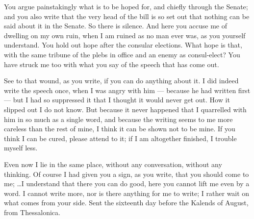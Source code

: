 

 You argue painstakingly what is to be hoped for, and chiefly through the Senate; and you also write that the very head of the bill is so set out that nothing can be said about it in the Senate. So there is silence. And here you accuse me of dwelling on my own ruin, when I am ruined as no man ever was, as you yourself understand. You hold out hope after the consular elections. What hope is that, with the same tribune of the plebs in office and an enemy as consul-elect? You have struck me too with what you say of the speech that has come out.

 See to that wound, as you write, if you can do anything about it. I did indeed write the speech once, when I was angry with him --- because he had written first --- but I had so suppressed it that I thought it would never get out. How it slipped out I do not know. But because it never happened that I quarrelled with him in so much as a single word, and because the writing seems to me more careless than the rest of mine, I think it can be shown not to be mine. If you think I can be cured, please attend to it; if I am altogether finished, I trouble myself less.

 Even now I lie in the same place, without any conversation, without any thinking. Of course I had given you a sign, as you write, that you should come to me; \textdagger\ldots\textdagger I understand that there you can do good, here you cannot lift me even by a word. I cannot write more, nor is there anything for me to write; I rather wait on what comes from your side. Sent the sixteenth day before the Kalends of August, from Thessalonica.

